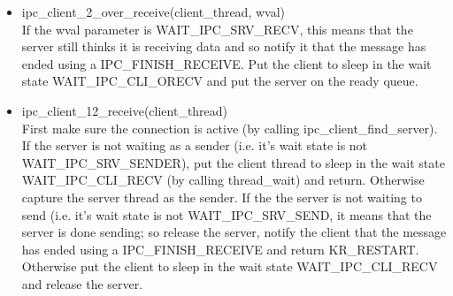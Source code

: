\begin{itemize}
\item ipc_client_2_over_receive(client_thread, wval)\\
  If the wval parameter is WAIT_IPC_SRV_RECV, this means that the
  server still thinks it is receiving data and so notify it that the
  message has ended using a IPC_FINISH_RECEIVE.
  Put the client to sleep in the wait state WAIT_IPC_CLI_ORECV and put
  the server on the ready queue.\\

\item ipc_client_12_receive(client_thread)\\
  First make sure the connection is active (by calling
  ipc_client_find_server). If the server is not waiting as a sender
  (i.e. it's wait state is not WAIT_IPC_SRV_SENDER), put the client
  thread to sleep in the wait state WAIT_IPC_CLI_RECV (by calling
  thread_wait) and return. Otherwise capture the server thread as the
  sender. If the the server is not waiting to send (i.e. it's wait
  state is not WAIT_IPC_SRV_SEND, it means that the server is done
  sending; so release the server, notify the client that the message
  has ended using a IPC_FINISH_RECEIVE and return
  KR_RESTART. Otherwise put the client to sleep in the wait state
  WAIT_IPC_CLI_RECV and release the server.

\end{itemize}

